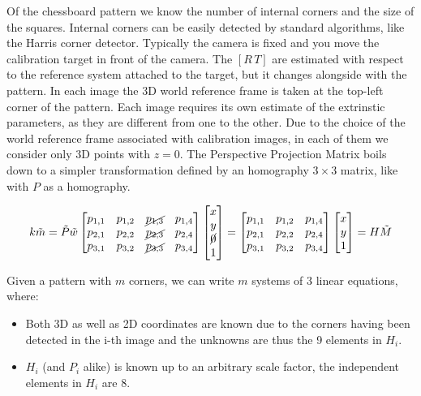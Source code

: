 \documentclass{article}
\begin{document}
Of the chessboard pattern we know the number of internal corners and the size of the squares.
Internal corners can be easily detected by standard algorithms, like the Harris corner detector.
Typically the camera is fixed and you move the calibration target in front of the camera.
The $[R\,T]$ are estimated with respect to the reference system attached to the target, but it changes alongside with the pattern.
In each image the 3D world reference frame is taken at the top-left corner of the pattern.
Each image requires its own estimate of the extrinstic parameters, as they are different from one to the other.
Due to the choice of the world reference frame associated with calibration images, in each of them we consider only 3D points with $z=0$.
The Perspective Projection Matrix boils down to a simpler transformation defined by an homography $3\times 3$ matrix, like with $P$ as a homography.

$$k\tilde{m} = \tilde{P}\tilde{w}
\begin{bmatrix}
  p_{1,1} & p_{1,2} & \cancel{p_{1,3}} & p_{1,4} \\
  p_{2,1} & p_{2,2} & \cancel{p_{2,3}} & p_{2,4} \\
  p_{3,1} & p_{3,2} & \cancel{p_{3,3}} & p_{3,4} 
\end{bmatrix}
\begin{bmatrix}
x \\ y \\ \cancel{0} \\ 1
\end{bmatrix}
=
\begin{bmatrix}
  p_{1,1} & p_{1,2} & p_{1,4} \\
  p_{2,1} & p_{2,2} & p_{2,4} \\
  p_{3,1} & p_{3,2} & p_{3,4} 
\end{bmatrix}
\begin{bmatrix}
x \\ y \\ 1
\end{bmatrix}
= H\tilde{M}
$$

Given a pattern with $m$ corners, we can write $m$ systems of 3 linear equations, where:
\begin{itemize}
  \item Both 3D as well as 2D coordinates are known due to the corners having been detected in the i-th image and the unknowns are thus the 9 elements in $H_i$.
  \item $H_i$ (and $P_i$ alike) is known up to an arbitrary scale factor, the independent elements in $H_i$ are 8.
\end{itemize}
\end{document}

